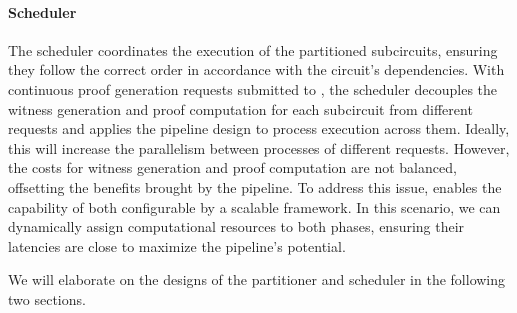 \paragraph{Scheduler}  
The scheduler coordinates the execution of the partitioned subcircuits, ensuring they follow the correct order in accordance with the circuit’s dependencies. With continuous proof generation requests submitted to \system, the scheduler decouples the witness generation and proof computation for each subcircuit from different requests and applies the pipeline design to process execution across them. Ideally, this will increase the parallelism between processes of different requests.
However, the costs for witness generation and proof computation are not balanced, offsetting the benefits brought by the pipeline. To address this issue,  \system enables the capability of both configurable by a scalable framework. In this scenario, we can dynamically assign computational resources to both phases, ensuring their latencies are close to maximize the pipeline's potential. 




We will elaborate on the designs of the partitioner and scheduler in the following two sections. 








